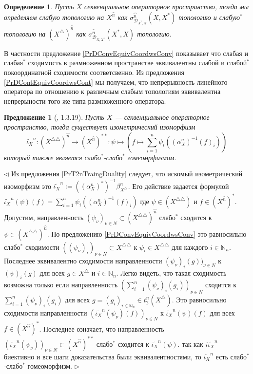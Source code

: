 \documentclass[12pt]{article}
\newtheorem{proposition}[theorem]{Предложение}
\newtheorem{definition}[theorem]{Определение}
\newenvironment{proof}{\par $\triangleleft$}{$\triangleright$}
\begin{document}
\begin{definition}\label{DefWeakConvForSQSp} Пусть $X$ секвенциальное операторное пространство, тогда мы определяем слабую топологию на $X^{\wideparen{n}}$ как $\sigma_{\mathcal{D}_{X^*,X}}^{\wideparen{n}}(X,X^*)$ топологию и слабую${}^*$ топологию на $(X^\triangle)^{\wideparen{n}}$ как $\sigma_{\mathcal{D}_{X,X^*}}^{\wideparen{n}}(X^*,X)$ топологию.
\end{definition}

В частности предложение \ref{PrDConvEquivCoordwsConv} показывает что слабая и слабая${}^*$ сходимость в размноженном пространстве эквивалентны слабой и слабой${}^*$ покоординатной сходимости соответсвенно. Из предложения \ref{PrDContEquivCoordwsCont} мы получаем, что непрерывность линейного оператора по отношению к различным слабым топологиям эквивалентна непрерыности того же типа размноженного оператора.


\begin{proposition}[\cite{LamOpFolgen}, 1.3.19]\label{PrDoubleDualIsom} Пусть $X$ --- секвенциальное операторное пространство, тогда существует изометрический изоморфизм
$$
\widetilde{\iota_X}^n:(X^{\triangle\triangle})^{\wideparen{n}}\to(X^{\wideparen{n}})^{**}:\psi\mapsto\left(f\mapsto\sum\limits_{i=1}^n \psi_i((\alpha_X^n)^{-1}(f)_i)\right)
$$
который также является слабо${}^*$-слабо${}^*$ гомеомрфизмом.
\end{proposition}
\begin{proof} Из предложения \ref{PrT2nTraingDuality}  следует, что искомый изометрический изоморфизм это $\widetilde{\iota_X}^n:=((\alpha_X^n)^*)^{-1}\beta_{X^\triangle}^n$. Его действие задается формулой $\widetilde{\iota_X}^n(\psi)(f)=\sum_{i=1}^n \psi_i((\alpha_X^n)^{-1}(f)_i)$ где $\psi\in (X^{\triangle\triangle})$ и $f\in (X^{\wideparen{n}})^*$. Допустим, направленность $(\psi_\nu)_{\nu\in N}\subset (X^{\triangle\triangle})^{\wideparen{n}}$ слабо${}^*$ сходится к $\psi\in (X^{\triangle\triangle})^{\wideparen{n}}$. По предложению \ref{PrDConvEquivCoordwsConv} это равносильно слабо${}^*$ сходимости $((\psi_\nu)_i)_{\nu\in N}\subset X^{\triangle\triangle}$ к $\psi_i\in X^{\triangle\triangle}$ для каждого $i\in\mathbb{N}_n$. Последнее эквивалентно сходимости направленности $(\psi_\nu)_i(g))_{\nu\in N}$ к $(\psi)_i(g)$ для всех $g\in X^\triangle$ и $i\in\mathbb{N}_n$. Легко видеть, что такая сходимость возможна только если направленность $(\sum_{i=1}^n(\psi_\nu)_i(g_i))_{\nu\in N}$ сходится к  $\sum_{i=1}^n(\psi_\nu)_i(g_i)$ для всех $g=(g_i)_{i\in\mathbb{N}_n}\in t_2^n(X^\triangle)$. Это равносильно сходимости направленности $(\widetilde{\iota_X}^n(\psi_\nu)(f))_{\nu\in N}$ к $\widetilde{\iota_X}^n(\psi)(f)$ для всех $f\in (X^{\wideparen{n}})^*$. Последнее означает, что направленность $(\widetilde{\iota_X}^n(\psi_\nu))_{\nu\in N}\subset (X^{\wideparen{n}})^{**}$ слабо${}^*$ сходится к $\widetilde{\iota_X}^n(\psi)$. так как $i\widetilde{\iota_X}^n$ биективно и все шаги доказательства были эквивалентностями, то $\widetilde{\iota_X}^n$ есть слабо${}^*$-слабо${}^*$ гомеоморфизм.
\end{proof}
\end{document}
